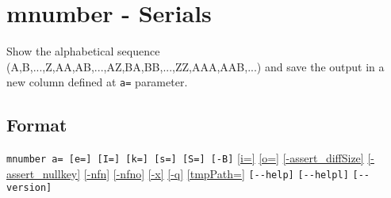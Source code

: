 
%

\section{mnumber - Serials\label{sect:mnumber}}

Show the alphabetical sequence (A,B,...,Z,AA,AB,...,AZ,BA,BB,...,ZZ,AAA,AAB,...) and save the output in a new column defined at \verb|a=| parameter. 


\subsection*{Format}
\verb|mnumber a= [e=] [I=] [k=] [s=] [S=] [-B]|
\hyperref[sect:option_i]{[i=]}
\hyperref[sect:option_o]{[o=]}
\hyperref[sect:option_assert_diffSize]{[-assert\_diffSize]}
\hyperref[sect:option_assert_nullkey]{[-assert\_nullkey]}
\hyperref[sect:option_nfn]{[-nfn]} 
\hyperref[sect:option_nfno]{[-nfno]}  
\hyperref[sect:option_x]{[-x]}
\hyperref[sect:option_q]{[-q]}
\hyperref[sect:option_option_tmppath]{[tmpPath=]}
\verb|[--help]|
\verb|[--helpl]|
\verb|[--version]|\\

